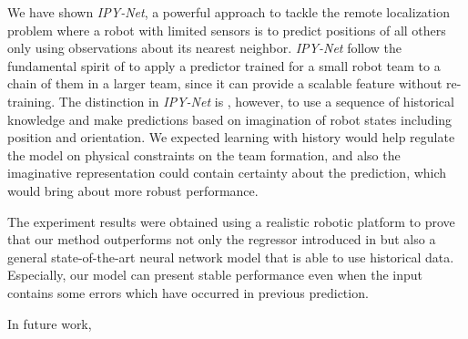 \documentclass[letterpaper, 10 pt, conference]{ieeeconf}  %
\begin{document}
	We have shown \emph{IPY-Net}, a powerful approach to tackle the remote localization problem 
	where a robot with limited sensors is to predict positions of all others only using 
	observations about its nearest neighbor. 
	\emph{IPY-Net} follow the fundamental spirit of \cite{CPR17} to apply a predictor 
	trained for a small robot team to a chain of them in a larger team, since it 
	can provide a scalable feature without re-training.   
	The distinction in \emph{IPY-Net} is , however, to use a sequence of historical knowledge and 
	make predictions based on imagination of robot states including position and orientation.
	We expected learning with history would help regulate the model on physical constraints on 
	the team formation, and also the imaginative representation could contain 
	certainty about the prediction, which would bring about more robust performance. 
	
	The experiment results were obtained using a realistic robotic platform to prove 
	that our method outperforms not only the regressor
	introduced in \cite{CPR17} but also a general state-of-the-art neural network 
	model that is able to use historical data. Especially, our model can present 
	stable performance even when the input contains some errors which have occurred in 
	previous prediction. 
	  
	
	In future work, 
	
	
{\small
	
	
}
\end{document}
